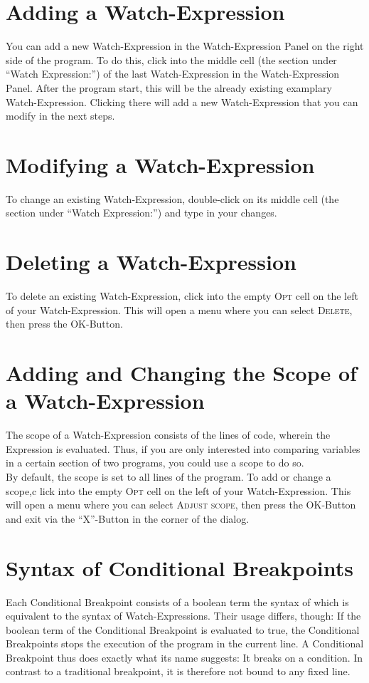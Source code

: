 \documentclass[parskip=full]{memoir}
\begin{document}
\section{Adding a Watch-Expression}\label{adding}
You can add a new Watch-Expression in the Watch-Expression Panel on the right side of the program. To do this, click into the middle cell (the section under \enquote{Watch Expression:}) of the last Watch-Expression in the Watch-Expression Panel. After the program start, this will be the already existing examplary Watch-Expression. Clicking there will add a new Watch-Expression that you can modify in the next steps.

\section{Modifying a Watch-Expression}\label{modifying}
To change an existing Watch-Expression, double-click on its middle cell (the section under \enquote{Watch Expression:}) and type in your changes.

\section{Deleting a Watch-Expression}\label{deleting}
To delete an existing Watch-Expression, click into the empty \textsc{Opt} cell on the left of your Watch-Expression. This will open a menu where you can select \textsc{Delete}, then press the \textsc{OK}-Button.

\section{Adding and Changing the Scope of a Watch-Expression}\label{scope}
The scope of a Watch-Expression consists of the lines of code, wherein the Expression is evaluated. Thus, if you are only interested into comparing variables in a certain section of two programs, you could use a scope to do so. \\
By default, the scope is set to all lines of the program.
To add or change a scope,c lick into the empty \textsc{Opt} cell on the left of your Watch-Expression. This will open a menu where you can select \textsc{Adjust scope}, then press the \textsc{OK}-Button and exit via the \enquote{X}-Button in the corner of the dialog.

\section{Syntax of Conditional Breakpoints}
Each Conditional Breakpoint consists of a boolean term the syntax of which is equivalent to the syntax of Watch-Expressions. Their usage differs, though: If the boolean term of the Conditional Breakpoint is evaluated to true, the Conditional Breakpoints stops the execution of the program in the current line. A Conditional Breakpoint thus does exactly what its name suggests: It breaks on a condition. In contrast to a traditional breakpoint, it is therefore not bound to any fixed line.
\end{document}
